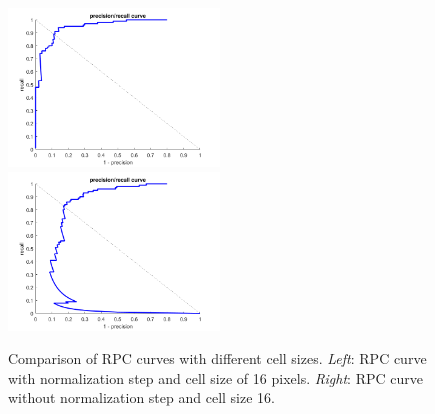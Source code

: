 \documentclass[12pt]{article}
\begin{document}
\begin{enumerate}[a)]
        \begin{figure}[h]			
        	\includegraphics[width=0.5\textwidth]{rpc_norm16}
        	\includegraphics[width=0.5\textwidth]{rpc_not_norm16}
        	\caption{Comparison of RPC curves with different cell sizes. \textit{Left}: RPC curve with normalization step and cell size of 16 pixels. \textit{Right}: RPC curve without normalization step and cell size 16. }
        \end{figure}
        


\end{enumerate}
\end{document}
